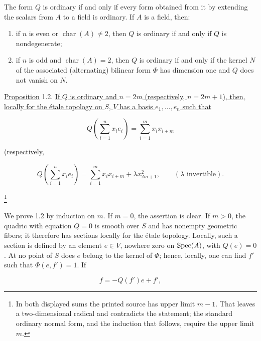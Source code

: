 The form $Q$ is ordinary if and only if every form obtained from it by
extending the scalars from $A$ to a field is ordinary.  If $A$ is a
field, then:

\begin{enumerate}[label=\alph*),leftmargin=2.5em]
\item if $n$ is even or $\operatorname{char}(A)\ne2$, then $Q$ is ordinary
if and only if $Q$ is nondegenerate;

\item if $n$ is odd and $\operatorname{char}(A)=2$, then $Q$ is ordinary
if and only if the kernel $N$ of the associated (alternating) bilinear
form $\Phi$ has dimension one and $Q$ does not vanish on $N$.
\end{enumerate}

\underline{Proposition} 1.2. \underline{If $Q$ is ordinary and
$n=2m$ (respectively, $n=2m+1$), then, locally for the étale topology on
$S$, $V$ has a basis $e_1,\ldots,e_n$ such that}


\begin{equation*}
Q\!\left(\sum_{i=1}^{n}x_i e_i\right)
=\sum_{i=1}^{m}x_i x_{i+m}
\end{equation*}

\noindent\underline{(respectively,}

\begin{equation*}
Q\!\left(\sum_{i=1}^{n}x_i e_i\right)
=\sum_{i=1}^{m}x_i x_{i+m}+\lambda x_{2m+1}^{2},
\qquad (\lambda\text{ invertible}).
\end{equation*}

\footnote{In both displayed sums the printed source has upper limit
$m-1$.  That leaves a two-dimensional radical and contradicts the
statement; the standard ordinary normal form, and the induction that
follows, require the upper limit $m$.}

We prove 1.2 by induction on $m$.  If $m=0$, the assertion is clear.  If
$m>0$, the quadric with equation $Q=0$ is smooth over $S$ and has
nonempty geometric fibers; it therefore has sections locally for the
étale topology.  Locally, such a section is defined by an element
$e\in V$, nowhere zero on $\operatorname{Spec}(A)$, with $Q(e)=0$.  At no point of $S$
does $e$ belong to the kernel of $\Phi$; hence, locally, one can find
$f'$ such that $\Phi(e,f')=1$.  If

\begin{equation*}
f=-Q(f')e+f',
\end{equation*}

